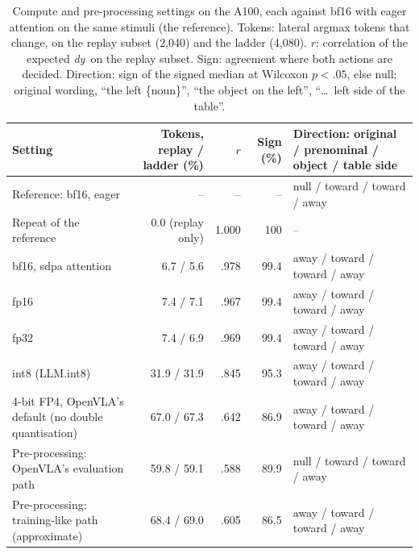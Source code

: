 \documentclass[conference]{IEEEtran}
\newcommand{\dy}{\textit{dy}}
\begin{document}
\begin{table}[t]
\centering
\scriptsize
\setlength{\tabcolsep}{3pt}
\caption{Compute and pre-processing settings on the A100, each against bf16 with eager attention on the same stimuli (the reference). Tokens: lateral argmax tokens that change, on the replay subset (2,040) and the ladder (4,080). $r$: correlation of the expected \dy\ on the replay subset. Sign: agreement where both actions are decided. Direction: sign of the signed median at Wilcoxon $p<.05$, else null; original wording, ``the left \{noun\}'', ``the object on the left'', ``\dots\ left side of the table''.}
\label{tab:ladder}
\begin{tabular}{@{}l r r r l@{}}
\toprule
Setting & Tokens, replay / ladder (\%) & $r$ & Sign (\%) & Direction: original / prenominal / object / table side\\
\midrule
Reference: bf16, eager & -- & -- & -- & null / toward / toward / away\\
Repeat of the reference & 0.0 (replay only) & 1.000 & 100 & --\\
bf16, sdpa attention & 6.7 / 5.6 & .978 & 99.4 & away / toward / toward / away\\
fp16 & 7.4 / 7.1 & .967 & 99.4 & away / toward / toward / away\\
fp32 & 7.4 / 6.9 & .969 & 99.4 & away / toward / toward / away\\
int8 (LLM.int8) & 31.9 / 31.9 & .845 & 95.3 & away / toward / toward / away\\
4-bit FP4, OpenVLA's default (no double quantisation) & 67.0 / 67.3 & .642 & 86.9 & away / toward / toward / away\\
\midrule
Pre-processing: OpenVLA's evaluation path & 59.8 / 59.1 & .588 & 89.9 & null / toward / toward / away\\
Pre-processing: training-like path (approximate) & 68.4 / 69.0 & .605 & 86.5 & away / toward / toward / away\\
\bottomrule
\end{tabular}
\end{table}
\end{document}
